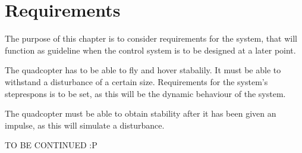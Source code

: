 \chapter{Requirements}
The purpose of this chapter is to consider requirements for the system, that will function as guideline when the control system is to be designed at a later point.

The quadcopter has to be able to fly and hover stabalily. It must be able to withstand a disturbance of a certain size. 
Requirements for the system's steprespons  is to be set, as this will be the dynamic behaviour of the system. 

The quadcopter must be able to obtain stability after it has been given an impulse, as this will simulate a disturbance.  


TO BE CONTINUED :P 

